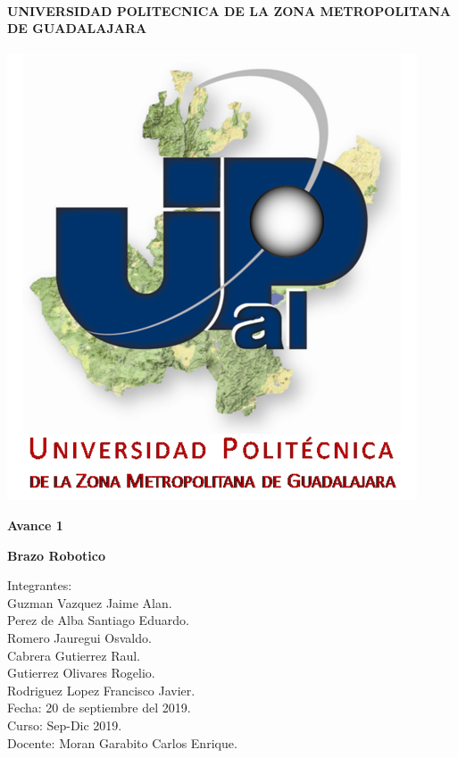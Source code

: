\documentclass[14pt,a4paper]{article}
\author{Rodriguez Lopez Francisco Javier}
\begin{document}
\begin{center}
\paragraph{\large UNIVERSIDAD POLITECNICA DE LA ZONA METROPOLITANA DE GUADALAJARA}

\includegraphics[scale=1]{Upzmg.png} 
\end{center}
\begin{center}
\textbf{\LARGE Avance 1}\\
\end{center}
\begin{center}
\textbf{\LARGE Brazo Robotico}
\end{center}


\large{Integrantes:}\\
\large{Guzman Vazquez Jaime Alan.\\
Perez de Alba Santiago Eduardo.\\
Romero Jauregui Osvaldo.\\
Cabrera Gutierrez Raul.\\
Gutierrez Olivares Rogelio.\\
Rodriguez Lopez Francisco Javier.\\

Fecha: 20 de septiembre del 2019.\\

Curso: Sep-Dic 2019.\\

Docente: Moran Garabito Carlos Enrique.\\}
\end{document}
